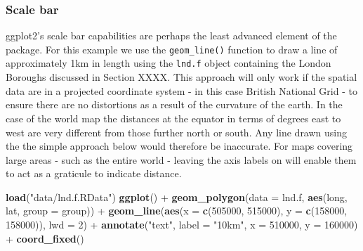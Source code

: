 \documentclass[]{article}
\newenvironment{Shaded}{}{}
\newcommand{\KeywordTok}[1]{\textcolor[rgb]{0.00,0.44,0.13}{\textbf{{#1}}}}
\newcommand{\DataTypeTok}[1]{\textcolor[rgb]{0.56,0.13,0.00}{{#1}}}
\newcommand{\DecValTok}[1]{\textcolor[rgb]{0.25,0.63,0.44}{{#1}}}
\newcommand{\StringTok}[1]{\textcolor[rgb]{0.25,0.44,0.63}{{#1}}}
\newcommand{\NormalTok}[1]{{#1}}
\begin{document}
\subsubsection{Scale bar}

ggplot2's scale bar capabilities are perhaps the least advanced element
of the package. For this example we use the \texttt{geom\_line()}
function to draw a line of approximately 1km in length using the
\texttt{lnd.f} object containing the London Boroughs discussed in
Section XXXX. This approach will only work if the spatial data are in a
projected coordinate system - in this case British National Grid - to
ensure there are no distortions as a result of the curvature of the
earth. In the case of the world map the distances at the equator in
terms of degrees east to west are very different from those further
north or south. Any line drawn using the the simple approach below would
therefore be inaccurate. For maps covering large areas - such as the
entire world - leaving the axis labels on will enable them to act as a
graticule to indicate distance.

\begin{Shaded}
\begin{Highlighting}[]
\KeywordTok{load}\NormalTok{(}\StringTok{"data/lnd.f.RData"}\NormalTok{)}
\KeywordTok{ggplot}\NormalTok{() + }\KeywordTok{geom_polygon}\NormalTok{(}\DataTypeTok{data =} \NormalTok{lnd.f, }\KeywordTok{aes}\NormalTok{(long, lat, }\DataTypeTok{group =} \NormalTok{group)) + }\KeywordTok{geom_line}\NormalTok{(}\KeywordTok{aes}\NormalTok{(}\DataTypeTok{x =} \KeywordTok{c}\NormalTok{(}\DecValTok{505000}\NormalTok{, }
    \DecValTok{515000}\NormalTok{), }\DataTypeTok{y =} \KeywordTok{c}\NormalTok{(}\DecValTok{158000}\NormalTok{, }\DecValTok{158000}\NormalTok{)), }\DataTypeTok{lwd =} \DecValTok{2}\NormalTok{) + }\KeywordTok{annotate}\NormalTok{(}\StringTok{"text"}\NormalTok{, }\DataTypeTok{label =} \StringTok{"10km"}\NormalTok{, }
    \DataTypeTok{x =} \DecValTok{510000}\NormalTok{, }\DataTypeTok{y =} \DecValTok{160000}\NormalTok{) + }\KeywordTok{coord_fixed}\NormalTok{()}
\end{Highlighting}
\end{Shaded}
\end{document}
